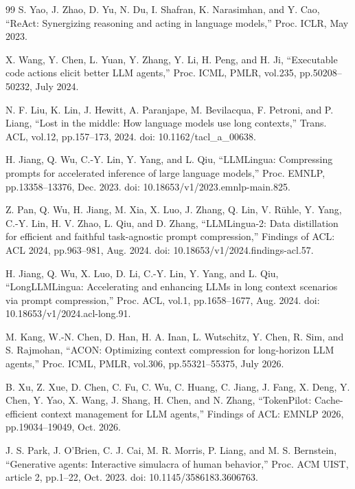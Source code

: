 \begin{thebibliography}{99}
S. Yao, J. Zhao, D. Yu, N. Du, I. Shafran, K. Narasimhan, and Y. Cao,
``ReAct: Synergizing reasoning and acting in language models,''
Proc. ICLR, May 2023.

X. Wang, Y. Chen, L. Yuan, Y. Zhang, Y. Li, H. Peng, and H. Ji,
``Executable code actions elicit better LLM agents,''
Proc. ICML, PMLR, vol.235, pp.50208--50232, July 2024.

N. F. Liu, K. Lin, J. Hewitt, A. Paranjape, M. Bevilacqua, F. Petroni, and P. Liang,
``Lost in the middle: How language models use long contexts,''
Trans. ACL, vol.12, pp.157--173, 2024.
doi: 10.1162/tacl\_a\_00638.

H. Jiang, Q. Wu, C.-Y. Lin, Y. Yang, and L. Qiu,
``LLMLingua: Compressing prompts for accelerated inference of large language models,''
Proc. EMNLP, pp.13358--13376, Dec. 2023.
doi: 10.18653/v1/2023.emnlp-main.825.

Z. Pan, Q. Wu, H. Jiang, M. Xia, X. Luo, J. Zhang, Q. Lin, V. R\"uhle,
Y. Yang, C.-Y. Lin, H. V. Zhao, L. Qiu, and D. Zhang,
``LLMLingua-2: Data distillation for efficient and faithful task-agnostic prompt compression,''
Findings of ACL: ACL 2024, pp.963--981, Aug. 2024.
doi: 10.18653/v1/2024.findings-acl.57.

H. Jiang, Q. Wu, X. Luo, D. Li, C.-Y. Lin, Y. Yang, and L. Qiu,
``LongLLMLingua: Accelerating and enhancing LLMs in long context scenarios via prompt compression,''
Proc. ACL, vol.1, pp.1658--1677, Aug. 2024.
doi: 10.18653/v1/2024.acl-long.91.

M. Kang, W.-N. Chen, D. Han, H. A. Inan, L. Wutschitz, Y. Chen,
R. Sim, and S. Rajmohan,
``ACON: Optimizing context compression for long-horizon LLM agents,''
Proc. ICML, PMLR, vol.306, pp.55321--55375, July 2026.

B. Xu, Z. Xue, D. Chen, C. Fu, C. Wu, C. Huang, C. Jiang, J. Fang,
X. Deng, Y. Chen, Y. Yao, X. Wang, J. Shang, H. Chen, and N. Zhang,
``TokenPilot: Cache-efficient context management for LLM agents,''
Findings of ACL: EMNLP 2026, pp.19034--19049, Oct. 2026.

J. S. Park, J. O'Brien, C. J. Cai, M. R. Morris, P. Liang, and M. S. Bernstein,
``Generative agents: Interactive simulacra of human behavior,''
Proc. ACM UIST, article 2, pp.1--22, Oct. 2023.
doi: 10.1145/3586183.3606763.


\end{thebibliography}
